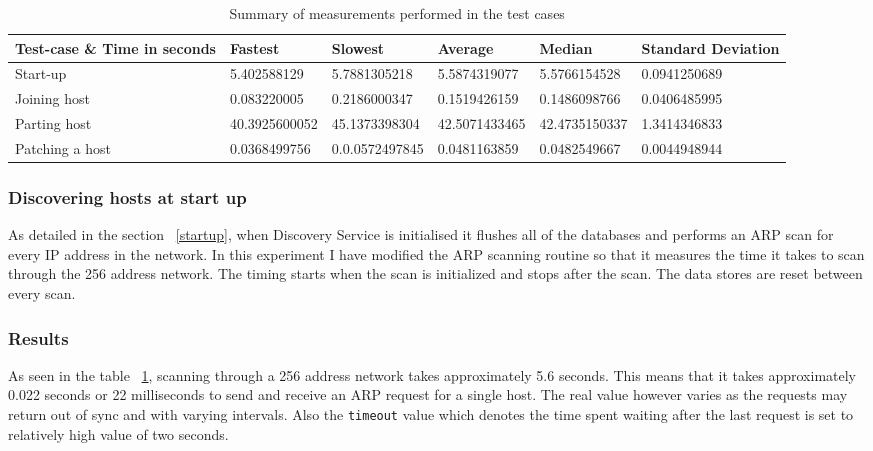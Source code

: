 \begin{landscape}
\begin{table}
\centering
\begin{tabular}{ | l || l | l | l | l | l |}
\hline 
Test-case \& Time in seconds & Fastest & Slowest & Average & Median & Standard Deviation \\
\hline \hline
Start-up & 5.402588129 & 5.7881305218 & 5.5874319077 & 5.5766154528 & 0.0941250689 \\
\hline
Joining host & 0.083220005 & 0.2186000347 & 0.1519426159 & 0.1486098766 & 0.0406485995 \\
\hline 
Parting host & 40.3925600052 & 45.1373398304 & 42.5071433465 & 42.4735150337 & 1.3414346833 \\
\hline
Patching a host & 0.0368499756 & 0.0.0572497845 & 0.0481163859 & 0.0482549667 & 0.0044948944 \\ 
\hline
\end{tabular}
\caption{Summary of measurements performed in the test cases}
\label{table:measurements}
\end{table}
\end{landscape}

\subsubsection{Discovering hosts at start up}

As detailed in the section ~\ref{startup}, when Discovery Service is initialised it flushes all of the databases and performs an ARP scan for every IP address in the network. In this experiment I have modified the ARP scanning routine so that it measures the time it takes to scan through the 256 address network. The timing starts when the scan is initialized and stops after the scan. The data stores are reset between every scan.

\subsubsection*{Results}

As seen in the table ~\ref{table:measurements}, scanning through a 256 address network takes approximately 5.6 seconds. This means that it takes approximately 0.022 seconds or 22 milliseconds to send and receive an ARP request for a single host. The real value however varies as the requests may return out of sync and with varying intervals. Also the \verb|timeout| value which denotes the time spent waiting after the last request is set to relatively high value of two seconds.

